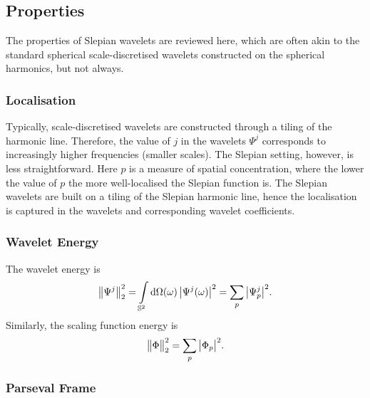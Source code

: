 

\subsection{Properties}\label{sec:chapter3_properties}

The properties of Slepian wavelets are reviewed here, which are often akin to the standard spherical scale-discretised wavelets constructed on the spherical harmonics, but not always.

\subsubsection{Localisation}\label{sec:chapter3_localisation}

Typically, scale-discretised wavelets are constructed through a tiling of the harmonic line.
Therefore, the value of \(j\) in the wavelets \(\Psi^{j}\) corresponds to increasingly higher frequencies (smaller scales).
The Slepian setting, however, is less straightforward.
Here \(p\) is a measure of spatial concentration, where the lower the value of \(p\) the more well-localised the Slepian function is.
The Slepian wavelets are built on a tiling of the Slepian harmonic line, hence the localisation is captured in the wavelets and corresponding wavelet coefficients.

\subsubsection{Wavelet Energy}

The wavelet energy is
%
\begin{equation}
	{\big\lVert\Psi^{j}\big\rVert}_{2}^{2}
	= \int\limits_{\mathbb{S}^{2}} \dd{\Omega(\omega)} \big\lvert\Psi^{j}(\omega)\big\rvert^{2}
	= \sum\limits_{p} \big\lvert{\Psi}_{p}^{j}\big\rvert^{2}.
\end{equation}
%
Similarly, the scaling function energy is
%
\begin{equation}
	{\big\lVert\Phi\big\rVert}_{2}^{2}
	= \sum\limits_{p} \big\lvert{\Phi}_{p}\big\rvert^{2}.
\end{equation}

\subsubsection{Parseval Frame}

